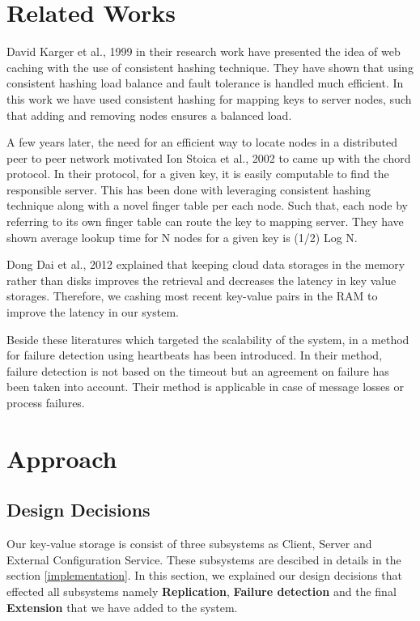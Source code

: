 \documentclass{sig-alternate}
\begin{document}
\section{Related Works}
David Karger et al., 1999 \cite{consistentHashing} in their research work have presented the idea of web caching with the use of consistent hashing technique. They have shown that using consistent hashing load  balance and fault tolerance is handled much efficient. 
In this work we have used consistent hashing for mapping keys to server nodes, such that adding and removing nodes ensures a balanced load.

A few years later, the need for an efficient way to locate nodes in a distributed peer to peer network motivated Ion Stoica et al., 2002 \cite{chord} to came up with the chord protocol. In their protocol, for a given key, it is easily computable to find the responsible server. This has been done with leveraging consistent hashing technique along with a novel finger table per each node. Such that, each node by referring to its own finger table can route the key to mapping server. They have shown average lookup time for N nodes for a given key is (1/2) Log N. 

Dong Dai et al., 2012 \cite{memory} explained that keeping cloud data storages in the memory rather than disks improves the retrieval and decreases the latency in key value storages. Therefore, we cashing most recent key-value pairs in the RAM to improve the latency in our system.

Beside these literatures which targeted the scalability of the system, in \cite{heartbeat} a method for failure detection using heartbeats has been introduced. In their method, failure detection is not based on the timeout  but an agreement on failure has been taken into account. Their method is applicable in case of message losses or process failures.


\section{Approach}
\subsection{Design Decisions}
Our key-value storage is consist of three subsystems as Client, Server and External Configuration Service. These subsystems are descibed in details in the section \ref{implementation}. In this section, we explained our design decisions that effected all subsystems namely  \textbf{Replication}, \textbf{Failure detection} and the final \textbf{Extension} that we have added to the system. 
\end{document}
